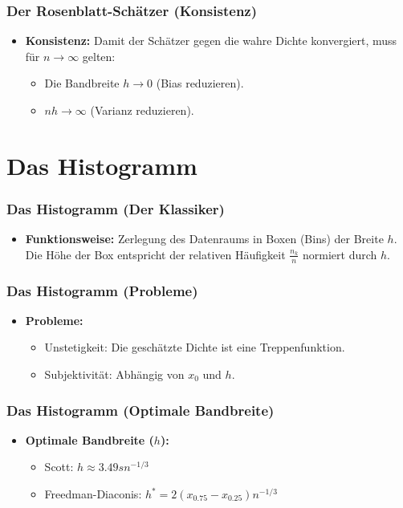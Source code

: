 \documentclass{beamer}
\begin{document}
\begin{frame}
	\frametitle{Der Rosenblatt-Schätzer (Konsistenz)}
	
	\begin{itemize}
		\item \textbf{Konsistenz:} Damit der Schätzer gegen die wahre Dichte konvergiert, muss für $n \to \infty$ gelten:
		\begin{itemize}
			\item Die Bandbreite $h \to 0$ (Bias reduzieren).
			\item $nh \to \infty$ (Varianz reduzieren).
		\end{itemize}
	\end{itemize}
\end{frame}

\section{Das Histogramm}

\begin{frame}
	\frametitle{Das Histogramm (Der Klassiker)}
	
	\begin{itemize}
		\item \textbf{Funktionsweise:} Zerlegung des Datenraums in Boxen (Bins) der Breite $h$. Die Höhe der Box entspricht der relativen Häufigkeit $\frac{n_k}{n}$ normiert durch $h$.
	\end{itemize}
\end{frame}

\begin{frame}
	\frametitle{Das Histogramm (Probleme)}
	\begin{itemize}
		\item \textbf{Probleme:}
		\begin{itemize} %
			\item Unstetigkeit: Die geschätzte Dichte ist eine Treppenfunktion.
			\item Subjektivität: Abhängig von $x_0$ und $h$.
		\end{itemize}
	\end{itemize}
\end{frame}


\begin{frame}
	\frametitle{Das Histogramm (Optimale Bandbreite)}
	
	\begin{itemize}
		\item \textbf{Optimale Bandbreite ($h$):}
		\begin{itemize}
			\item Scott: $h \approx 3.49 s n^{-1/3}$
			\item Freedman-Diaconis: $h^* = 2(x_{0.75} - x_{0.25})n^{-1/3}$
		\end{itemize}
	\end{itemize}
\end{frame}
\end{document}
